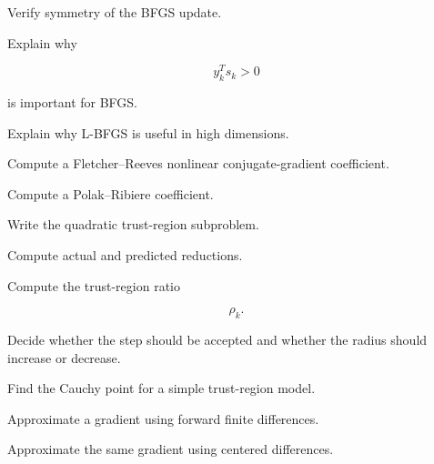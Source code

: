 \begin{exercise}[3]
Verify symmetry of the BFGS update.
\end{exercise}

\begin{exercise}[3]
Explain why

\[
y_k^Ts_k>0
\]

is important for BFGS.
\end{exercise}

\begin{exercise}[3]
Explain why L-BFGS is useful in high dimensions.
\end{exercise}

\begin{exercise}[3]
Compute a Fletcher--Reeves nonlinear conjugate-gradient coefficient.
\end{exercise}

\begin{exercise}[3]
Compute a Polak--Ribiere coefficient.
\end{exercise}

\begin{exercise}[2]
Write the quadratic trust-region subproblem.
\end{exercise}

\begin{exercise}[3]
Compute actual and predicted reductions.
\end{exercise}

\begin{exercise}[3]
Compute the trust-region ratio

\[
\rho_k.
\]
\end{exercise}

\begin{exercise}[3]
Decide whether the step should be accepted and whether the radius should
increase or decrease.
\end{exercise}

\begin{exercise}[3]
Find the Cauchy point for a simple trust-region model.
\end{exercise}

\begin{exercise}[2]
Approximate a gradient using forward finite differences.
\end{exercise}

\begin{exercise}[3]
Approximate the same gradient using centered differences.
\end{exercise}

